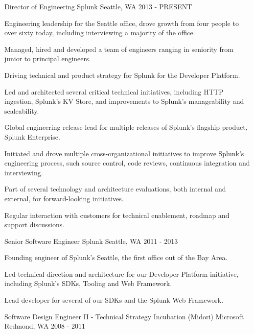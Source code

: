 \begin{cventries}
  \cventry
    {Director of Engineering}
    {Splunk}
    {Seattle, WA}
    {2013 - PRESENT}
    {
      \begin{cvitems}
        \item {Engineering leadership for the Seattle office, drove growth from four people to over sixty today, including interviewing a majority of the office.}
        \item {Managed, hired and developed a team of engineers ranging in seniority from junior to principal engineers.}
        \item {Driving technical and product strategy for Splunk for the Developer Platform.}
        \item {Led and architected several critical technical initiatives, including HTTP ingestion, Splunk's KV Store, and improvements to Splunk's manageability and scaleability.}
        \item {Global engineering release lead for multiple releases of Splunk's flagship product, Splunk Enterprise.}
        \item {Initiated and drove multiple cross-organizational initiatives to improve Splunk's engineering process, such source control, code reviews, continuous integration and interviewing.}
        \item {Part of several technology and architecture evaluations, both internal and external, for forward-looking initiatives.}
        \item {Regular interaction with customers for technical enablement, roadmap and support discussions.}
      \end{cvitems}
    }
  \cventry
    {Senior Software Engineer}
    {Splunk}
    {Seattle, WA}
    {2011 - 2013}
    {
      \begin{cvitems}
    		\item {Founding engineer of Splunk's Seattle, the first office out of the Bay Area.}
    		\item {Led technical direction and architecture for our Developer Platform initiative, including Splunk's SDKs, Tooling and Web Framework.}
    		\item {Lead developer for several of our SDKs and the Splunk Web Framework.}
      \end{cvitems}
    }
  \cventry
    {Software Design Engineer II - Technical Strategy Incubation (Midori)}
    {Microsoft}
    {Redmond, WA}
    {2008 - 2011}
    {
      \begin{cvitems}

\end{cvitems}}
\end{cventries}
